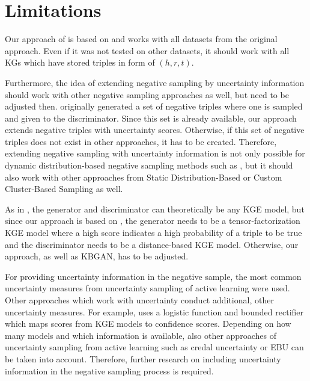 \section{Limitations}  
\label{sec:limitations}
%
Our approach of \usgan is based on \kbgan and works with all datasets from the original approach.
Even if it was not tested on other datasets, it should work with all \acp{KG} which have stored triples in form of $(h,r,t)$.

Furthermore, the idea of extending negative sampling by uncertainty information should work with other negative sampling approaches as well, but need to be adjusted then.
\kbgan originally generated a set of negative triples where one is sampled and given to the discriminator.
Since this set is already available, our approach extends negative triples with uncertainty scores.
Otherwise, if this set of negative triples does not exist in other approaches, it has to be created.
Therefore, extending negative sampling with uncertainty information is not only possible for dynamic distribution-based negative sampling methods such as \kbgan, but it should also work with other approaches from Static Distribution-Based or Custom Cluster-Based Sampling as well.

As in \kbgan, the generator and discriminator can theoretically be any \ac{KGE} model, but since our approach is based on \kbgan, the generator needs to be a tensor-factorization \ac{KGE} model where a high score indicates a high probability of a triple to be true and the discriminator needs to be a distance-based \ac{KGE} model.
Otherwise, our approach, as well as \textsc{KBGAN}, has to be adjusted.

For providing uncertainty information in the negative sample, the most common uncertainty measures from uncertainty sampling of active learning were used.
Other approaches which work with uncertainty conduct additional, other uncertainty measures.
For example, \cite{UKGE} uses a logistic function and bounded rectifier which maps scores from \ac{KGE} models to confidence scores.
Depending on how many models and which information is available, also other approaches of uncertainty sampling from active learning such as credal uncertainty or \ac{EBU} can be taken into account.
Therefore, further research on including uncertainty information in the negative sampling process is required.